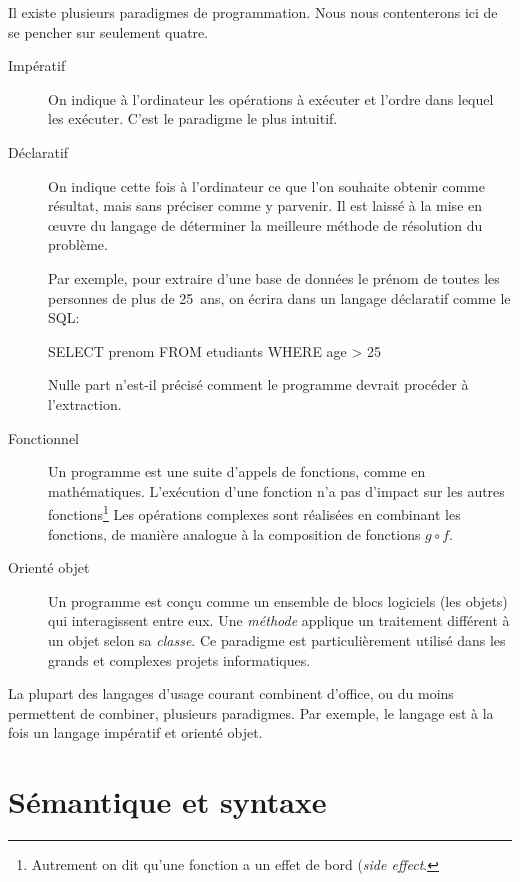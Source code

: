 Il existe plusieurs paradigmes de programmation. Nous nous
contenterons ici de se pencher sur seulement quatre.

\begin{description}
\item[Impératif]  On indique à l'ordinateur
  les opérations à exécuter et l'ordre dans lequel les exécuter. C'est
  le paradigme le plus intuitif.
\item[Déclaratif]  On indique cette fois à
  l'ordinateur ce que l'on souhaite obtenir comme résultat, mais sans
  préciser comme y parvenir. Il est laissé à la mise en œuvre du
  langage de déterminer la meilleure méthode de résolution du
  problème.

  Par exemple, pour extraire d'une base de données  le
  prénom de toutes les personnes de plus de 25~ans, on écrira dans un
  langage déclaratif comme le SQL:
\begin{Schunk}
\begin{Sinput}
SELECT prenom FROM etudiants WHERE age > 25
\end{Sinput}
\end{Schunk}
  Nulle part n'est-il précisé comment le programme devrait procéder à
  l'extraction.
\item[Fonctionnel]  Un programme est une
  suite d'appels de fonctions, comme en mathématiques. L'exécution
  d'une fonction n'a pas d'impact sur les autres fonctions\footnote{%
    Autrement on dit qu'une fonction a un effet de bord (\emph{side
      effect}.} %
  Les opérations complexes sont réalisées en combinant les fonctions,
  de manière analogue à la composition de fonctions $g \circ f$.
\item[Orienté objet]  Un programme est
  conçu comme un ensemble de blocs logiciels (les objets) qui
  interagissent entre eux. Une \emph{méthode} applique un traitement
  différent à un objet selon sa \emph{classe}. Ce paradigme est
  particulièrement utilisé dans les grands et complexes projets
  informatiques.
\end{description}

La plupart des langages d'usage courant combinent d'office, ou du
moins permettent de combiner, plusieurs paradigmes. Par exemple, le
langage {\Cpp} est à la fois un langage impératif et orienté objet.


\section{Sémantique et syntaxe}
\label{sec:informatique:semantique}

